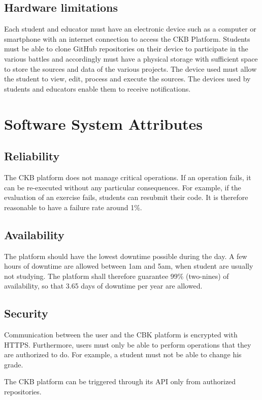 \subsection{Hardware limitations}
Each student and educator must have an electronic device such as a computer or smartphone with an internet connection to
access the CKB Platform.
Students must be able to clone GitHub repositories on their device to participate in the various battles and accordingly must have a physical storage with sufficient space to store the sources and data of the various projects.
The device used must allow the student to view, edit, process and execute the sources.
The devices used by students and educators enable them to receive notifications.

\section{Software System Attributes}
\subsection{Reliability}
The CKB platform does not manage critical operations.
If an operation fails, it can be re-executed without any particular consequences.
For example, if the evaluation of an exercise fails, students can resubmit their code.
It is therefore reasonable to have a failure rate around 1\%.

\subsection{Availability}
The platform should have the lowest downtime possible during the day.
A few hours of downtime are allowed between 1am and 5am, when student are usually not studying.
The platform shall therefore guarantee 99\% (two-nines) of availability, so that 3.65 days of downtime per year are allowed.

\subsection{Security}
Communication between the user and the CBK platform is encrypted with HTTPS. %
Furthermore, users must only be able to perform operations that they are authorized to do.
For example, a student must not be able to change his grade.

The CKB platform can be triggered through its API only from authorized repositories.

